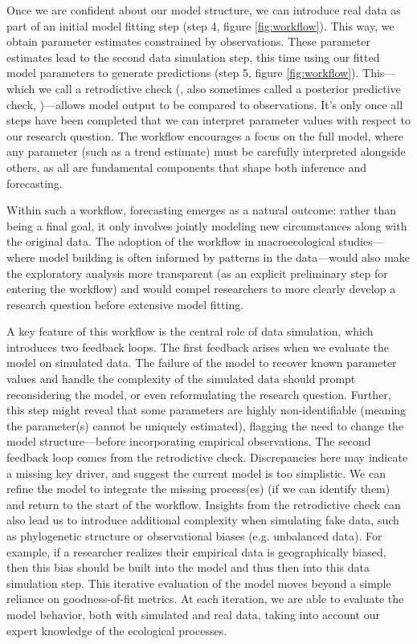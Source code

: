 \documentclass[11pt]{article}
\begin{document}
Once we are confident about our model structure, we can introduce real data as part of an initial model fitting step (step 4, figure \ref{fig:workflow}). This way, we obtain parameter estimates constrained by observations. 
These parameter estimates lead to the second data simulation step, this time using our fitted model parameters to generate predictions (step 5, figure \ref{fig:workflow}). This---which we call a retrodictive check (\citealp{betanworkflow}, also sometimes called a posterior predictive check, \citealp{Gelman2020})---allows model output to be compared to observations. 
It's only once all steps have been completed that we can interpret parameter values with respect to our research question.
The workflow encourages a focus on the full model, where any parameter (such as a trend estimate) must be carefully interpreted alongside others, as all are fundamental components that shape both inference and forecasting. 

Within such a workflow, forecasting emerges as a natural outcome: rather than being a final goal, it only involves jointly modeling new circumstances along with the original data. The adoption of the workflow in macroecological studies---where model building is often informed by patterns in the data---would also make the exploratory analysis more transparent (as an explicit preliminary step for entering the workflow) and would compel researchers to more clearly develop a research question before extensive model fitting. 

A key feature of this workflow is the central role of data simulation, which introduces two feedback loops. The first feedback arises when we evaluate the model on simulated data.
The failure of the model to recover known parameter values and handle the complexity of the simulated data should prompt reconsidering the model, or even reformulating the research question.
Further, this step might reveal that some parameters are highly non-identifiable (meaning the parameter(s) cannot be uniquely estimated),
flagging the need to change the model structure---before incorporating empirical observations. 
The second feedback loop comes from the retrodictive check. 
Discrepancies here may indicate a missing key driver, and suggest the current model is too simplistic. We can refine the model to integrate the missing process(es) (if we can identify them) and return to the start of the workflow. Insights from the retrodictive check can also lead us to introduce additional complexity when simulating fake data, such as phylogenetic structure or observational biases (e.g. unbalanced data). For example, if a researcher realizes their empirical data is geographically biased, then this bias should be built into the model and thus then into this data simulation step. This iterative evaluation of the model moves beyond a simple reliance on goodness-of-fit metrics. At each iteration, we are able to evaluate the model behavior, both with simulated and real data, taking into account our expert knowledge of the ecological processes. 
\end{document}
